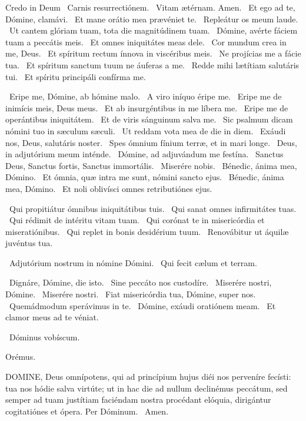 Credo in Deum  \V\ Carnis resurrectiónem. \R\ Vitam ætérnam. Amen. \V\ Et ego ad te, Dómine, clamávi. \R\ Et mane orátio mea prævéniet te. \V\ Repleátur os meum laude. \R\ Ut cantem glóriam tuam, tota die magnitúdinem tuam. \V\ Dómine, avérte fáciem tuam a peccátis meis. \R\ Et omnes iniquitátes meas dele. \V\ Cor mundum crea in me, Deus. \R\ Et spíritum rectum ínnova in viscéribus meis. \V\ Ne projícias me a fácie tua. \R\ Et spíritum sanctum tuum ne áuferas a me. \V\ Redde mihi lætítiam salutáris tui. \R\ Et spíritu principáli confírma me.


\V\ Eripe me, Dómine, ab hómine malo. \R\ A viro iníquo éripe me. \V\ Eripe me de inimícis meis, Deus meus. \R\ Et ab insurgéntibus in me líbera me. \V\ Eripe me de operántibus iniquitátem. \R\ Et de viris sánguinum salva me. \V\ Sic psalmum dicam nómini tuo in sæculum sæculi. \R\ Ut reddam vota mea de die in diem. \V\ Exáudi nos, Deus, salutáris noster. \R\ Spes ómnium fínium terræ, et in mari longe. \V\ Deus, in adjutórium meum inténde. \R\ Dómine, ad adjuvándum me festína. \V\ Sanctus Deus, Sanctus fortis, Sanctus immortális. \R\ Miserére nobis. \V\ Bénedic, ánima mea, Dómino. \R\ Et ómnia, quæ intra me sunt, nómini sancto ejus. \V\ Bénedic, ánima mea, Dómino. \R\ Et noli oblivísci omnes retributiónes ejus.

\V\ Qui propitiátur ómnibus iniquitátibus tuis. \R\ Qui sanat omnes infirmitátes tuas. \V\ Qui rédimit de intéritu vitam tuam. \R\ Qui corónat te in misericórdia et miseratiónibus. \V\ Qui replet in bonis desidérium tuum. \R\ Renovábitur ut áquilæ juvéntus tua.


\V\ Adjutórium nostrum in nómine Dómini. \R\ Qui fecit cælum et terram.


\V\ Dignáre, Dómine, die isto. \R\ Sine peccáto nos custodíre. \V\ Miserére nostri, Dómine. \R\ Miserére nostri. \V\ Fiat misericórdia tua, Dómine, super nos. \R\ Quemádmodum sperávimus in te. \V\ Dómine, exáudi oratiónem meam. \R\ Et clamor meus ad te véniat.

\V\ Dóminus vobíscum.

Orémus. 

\lettrine[lines=2]{D}{OMINE}, Deus omnípotens, qui ad princípium hujus diéi nos perveníre fecísti: tua nos hódie salva virtúte; ut in hac die ad nullum declinémus peccátum, sed semper ad tuam justítiam faciéndam nostra procédant elóquia, dirigántur cogitatiónes et ópera. Per Dóminum. \R\ Amen.

